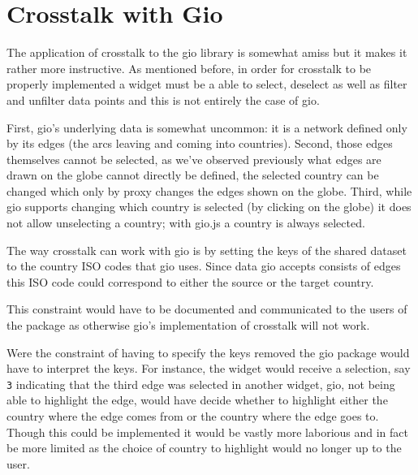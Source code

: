 \documentclass[
]{krantz}
\makeatletter
\newenvironment{Shaded}{\begin{snugshade}}{\end{snugshade}}
\newcommand{\CommentTok}[1]{\textcolor[rgb]{0.37,0.37,0.37}{\textit{#1}}}
\newcommand{\DataTypeTok}[1]{\textcolor[rgb]{0.27,0.27,0.27}{#1}}
\newcommand{\KeywordTok}[1]{\textcolor[rgb]{0.27,0.27,0.27}{\textbf{#1}}}
\newcommand{\NormalTok}[1]{#1}
\newcommand{\OperatorTok}[1]{\textcolor[rgb]{0.43,0.43,0.43}{\textbf{#1}}}
\newcommand{\StringTok}[1]{\textcolor[rgb]{0.5,0.5,0.5}{#1}}
\newenvironment{kframe}{%
\medskip{}
\setlength{\fboxsep}{.8em}
 \def\at@end@of@kframe{}%
 \ifinner\ifhmode%
  \def\at@end@of@kframe{\end{minipage}}%
  \begin{minipage}{\columnwidth}%
 \fi\fi%
 \def\FrameCommand##1{\hskip\@totalleftmargin \hskip-\fboxsep
 \colorbox{shadecolor}{##1}\hskip-\fboxsep
     \hskip-\linewidth \hskip-\@totalleftmargin \hskip\columnwidth}%
 \MakeFramed {\advance\hsize-\width
   \@totalleftmargin\z@ \linewidth\hsize
   \@setminipage}}%
 {\par\unskip\endMakeFramed%
 \at@end@of@kframe}
\renewenvironment{Shaded}{\begin{kframe}}{\end{kframe}}
\makeatother
\begin{document}
\hypertarget{linking-widgets-gio}{%
\section{Crosstalk with Gio}\label{linking-widgets-gio}}

The application of crosstalk to the gio library is somewhat amiss but it makes it rather more instructive. As mentioned before, in order for crosstalk to be properly implemented a widget must be a able to select, deselect as well as filter and unfilter data points and this is not entirely the case of gio.

First, gio's underlying data is somewhat uncommon: it is a network defined only by its edges (the arcs leaving and coming into countries). Second, those edges themselves cannot be selected, as we've observed previously what edges are drawn on the globe cannot directly be defined, the selected country can be changed which only by proxy changes the edges shown on the globe. Third, while gio supports changing which country is selected (by clicking on the globe) it does not allow unselecting a country; with gio.js a country is always selected.

The way crosstalk can work with gio is by setting the keys of the shared dataset to the country ISO codes that gio uses. Since data gio accepts consists of edges this ISO code could correspond to either the source or the target country.

\begin{Shaded}
\end{Shaded}

This constraint would have to be documented and communicated to the users of the package as otherwise gio's implementation of crosstalk will not work.

Were the constraint of having to specify the keys removed the gio package would have to interpret the keys. For instance, the widget would receive a selection, say \texttt{3} indicating that the third edge was selected in another widget, gio, not being able to highlight the edge, would have decide whether to highlight either the country where the edge comes from or the country where the edge goes to. Though this could be implemented it would be vastly more laborious and in fact be more limited as the choice of country to highlight would no longer up to the user.
\end{document}
